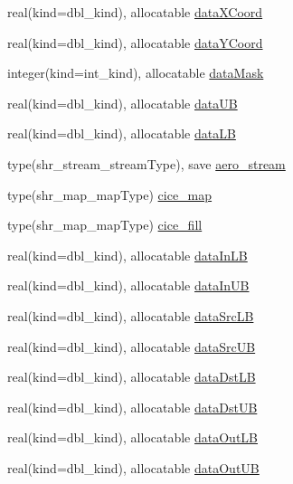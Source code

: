 \begin{DoxyCompactItemize}
\item 
real(kind=dbl\_\-kind), allocatable \hyperlink{namespaceice__prescaero__mod_aec4bdb0ed27915f50239245791a64619}{dataXCoord}
\item 
real(kind=dbl\_\-kind), allocatable \hyperlink{namespaceice__prescaero__mod_a7ebbdee8a01449422409a6d584c84806}{dataYCoord}
\item 
integer(kind=int\_\-kind), allocatable \hyperlink{namespaceice__prescaero__mod_ab34b112295019ba547110ff459523bd4}{dataMask}
\item 
real(kind=dbl\_\-kind), allocatable \hyperlink{namespaceice__prescaero__mod_a5dc80d6924fb5d7281e3ed6a94055e43}{dataUB}
\item 
real(kind=dbl\_\-kind), allocatable \hyperlink{namespaceice__prescaero__mod_adb7c17b56a47e03225f2fe34bee46d47}{dataLB}
\item 
type(shr\_\-stream\_\-streamType), save \hyperlink{namespaceice__prescaero__mod_acec6a7f28171dd632bbd24ad76884414}{aero\_\-stream}
\item 
type(shr\_\-map\_\-mapType) \hyperlink{namespaceice__prescaero__mod_a4975c089616e76a62c08619dc3e4fd8a}{cice\_\-map}
\item 
type(shr\_\-map\_\-mapType) \hyperlink{namespaceice__prescaero__mod_a24d44223461a3f3c815c1c8ef882947f}{cice\_\-fill}
\item 
real(kind=dbl\_\-kind), allocatable \hyperlink{namespaceice__prescaero__mod_a7ef634010a6c0d07c52a41321fce88d6}{dataInLB}
\item 
real(kind=dbl\_\-kind), allocatable \hyperlink{namespaceice__prescaero__mod_a0f7120047c00901e14be1cb218202430}{dataInUB}
\item 
real(kind=dbl\_\-kind), allocatable \hyperlink{namespaceice__prescaero__mod_afbd1563a75a090ddd309cc987ea8e9e5}{dataSrcLB}
\item 
real(kind=dbl\_\-kind), allocatable \hyperlink{namespaceice__prescaero__mod_ad4ef44bba9c163d1a0cdd1f739878aff}{dataSrcUB}
\item 
real(kind=dbl\_\-kind), allocatable \hyperlink{namespaceice__prescaero__mod_a7b35ab67e4a9bc5affef31d7a418c8cc}{dataDstLB}
\item 
real(kind=dbl\_\-kind), allocatable \hyperlink{namespaceice__prescaero__mod_aaafab7a06140832287cfb2357f553967}{dataDstUB}
\item 
real(kind=dbl\_\-kind), allocatable \hyperlink{namespaceice__prescaero__mod_ab068cb9460ac0d6936bf8b6ffc60d694}{dataOutLB}
\item 
real(kind=dbl\_\-kind), allocatable \hyperlink{namespaceice__prescaero__mod_ad753676afac58f6bdbb0c4ad5f330c09}{dataOutUB}

\end{DoxyCompactItemize}
